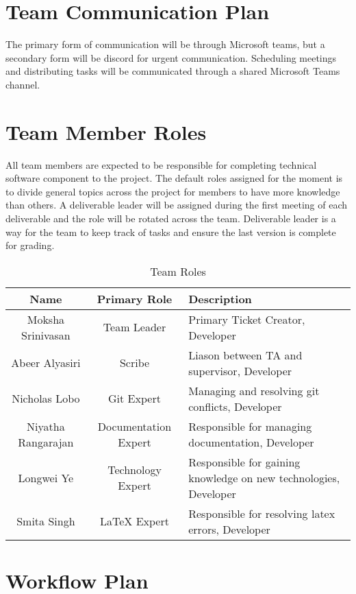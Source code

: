 \documentclass{article}
\begin{document}
\section{Team Communication Plan}
The primary form of communication will be through Microsoft teams, but a secondary form will be discord for urgent communication. Scheduling meetings and distributing tasks will be communicated through a shared Microsoft Teams channel. %

\section{Team Member Roles} 
All team members are expected to be responsible for completing technical software component to the project. The default roles assigned for the moment is to divide general topics across the project for members to have more knowledge than others. A deliverable leader will be assigned during the first meeting of each deliverable and the role will be rotated across the team. Deliverable leader is a way for the team to keep track of tasks and ensure the last version is complete for grading. 
\begin{table}[H]
    \centering
    \begin{tabular}{|c|c|p{60mm}|}
         \hline
         Name & Primary Role & Description\\
         \hline
         Moksha Srinivasan & Team Leader & Primary Ticket Creator, Developer\\
         \hline
         Abeer Alyasiri & Scribe & Liason between TA and supervisor, Developer\\
         \hline
         Nicholas Lobo & Git Expert & Managing and resolving git conflicts, Developer \\
         \hline
         Niyatha Rangarajan & Documentation Expert & Responsible for managing documentation, Developer \\
         \hline
         Longwei Ye & Technology Expert & Responsible for gaining knowledge on new technologies, Developer  \\
         \hline
         Smita Singh & LaTeX Expert & Responsible for resolving latex errors, Developer \\
         \hline
    \end{tabular}
    \caption{Team Roles}
    \label{tab:team_roles}
\end{table}

\section{Workflow Plan} %
\end{document}
